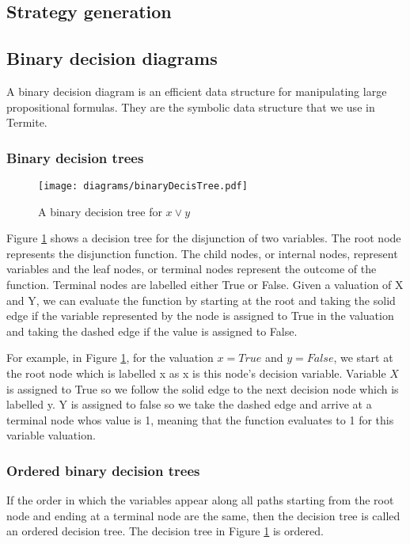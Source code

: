 \subsection{Strategy generation}
\subsection{Binary decision diagrams}

A binary decision diagram is an efficient data structure for manipulating large propositional formulas. They are the symbolic data structure that we use in Termite.

\subsubsection{Binary decision trees}

\begin{figure}[t]
\centering
\texttt{[image: diagrams/binaryDecisTree.pdf]}
\caption{A binary decision tree for $x \vee y$}
\label{fig:decis_tree}
\end{figure}

Figure \ref{fig:decis_tree} shows a decision tree for the disjunction of two variables. The root node represents the disjunction function. The child nodes, or internal nodes, represent variables and the leaf nodes, or terminal nodes represent the outcome of the function. Terminal nodes are labelled either True or False. Given a valuation of X and Y, we can evaluate the function by starting at the root and taking the solid edge if the variable represented by the node is assigned to True in the valuation and taking the dashed edge if the value is assigned to False. 

For example, in Figure \ref{fig:decis_tree}, for the valuation $x=True$ and $y=False$, we start at the root node which is labelled x as x is this node's decision variable. Variable $X$ is assigned to True so we follow the solid edge to the next decision node which is labelled y. Y is assigned to false so we take the dashed edge and arrive at a terminal node whos value is 1, meaning that the function evaluates to 1 for this variable valuation.

\subsubsection{Ordered binary decision trees}

If the order in which the variables appear along all paths starting from the root node and ending at a terminal node are the same, then the decision tree is called an ordered decision tree. The decision tree in Figure \ref{fig:decis_tree} is ordered.

